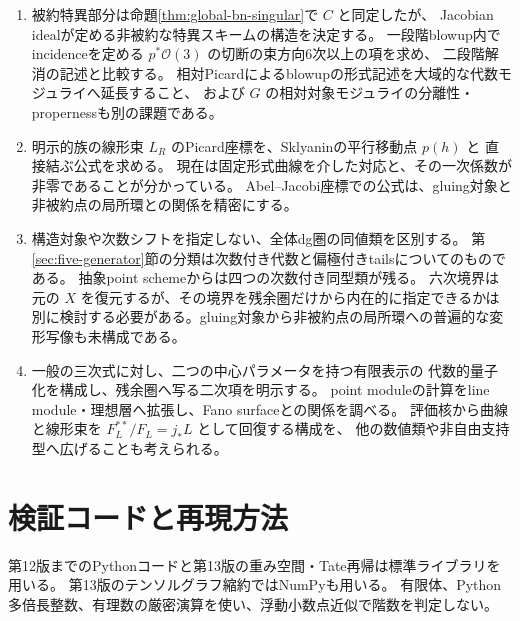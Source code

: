 \documentclass[a4paper,11pt]{ltjsarticle}
\theoremstyle{definition}
\newcommand{\OO}{\mathcal O}
\begin{document}
\begin{enumerate}
 \item 被約特異部分は命題\ref{thm:global-bn-singular}で $C$ と同定したが、
 Jacobian idealが定める非被約な特異スキームの構造を決定する。
 一段階blowup内でincidenceを定める $p^*\OO(3)$ の切断の束方向6次以上の項を求め、
 二段階解消の記述と比較する。
 相対Picardによるblowupの形式記述を大域的な代数モジュライへ延長すること、
 および $G$ の相対対象モジュライの分離性・propernessも別の課題である。
 \item 明示的族の線形束 $L_R$ のPicard座標を、Sklyaninの平行移動点 $p(h)$ と
 直接結ぶ公式を求める。
 現在は固定形式曲線を介した対応と、その一次係数が非零であることが分かっている。
 Abel--Jacobi座標での公式は、gluing対象と非被約点の局所環との関係を精密にする。
 \item 構造対象や次数シフトを指定しない、全体dg圏の同値類を区別する。
 第\ref{sec:five-generator}節の分類は次数付き代数と偏極付きtailsについてのものである。
 抽象point schemeからは四つの次数付き同型類が残る。
 六次境界は元の $X$ を復元するが、その境界を残余圏だけから内在的に指定できるかは
 別に検討する必要がある。gluing対象から非被約点の局所環への普遍的な変形写像も未構成である。
 \item 一般の三次式に対し、二つの中心パラメータを持つ有限表示の
 代数的量子化を構成し、残余圏へ写る二次項を明示する。
 point moduleの計算をline module・理想層へ拡張し、Fano surfaceとの関係を調べる。
 評価核から曲線と線形束を $F_L^{**}/F_L=j_*L$ として回復する構成を、
 他の数値類や非自由支持型へ広げることも考えられる。
\end{enumerate}

\clearpage
\appendix
\section{検証コードと再現方法}

第12版までのPythonコードと第13版の重み空間・Tate再帰は標準ライブラリを用いる。
第13版のテンソルグラフ縮約ではNumPyも用いる。
有限体、Python多倍長整数、有理数の厳密演算を使い、浮動小数点近似で階数を判定しない。
\end{document}
